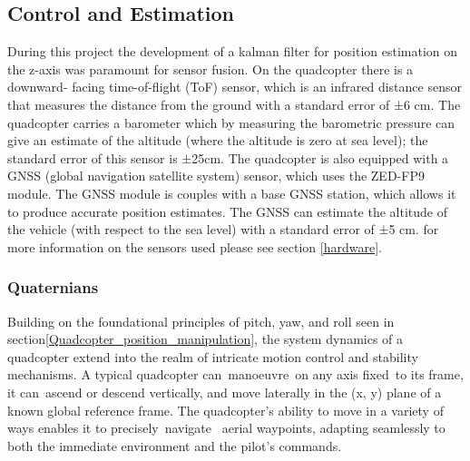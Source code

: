 \documentclass{article}
\begin{document}
\subsection{Control and Estimation}\label{control_and_estimation}
During this project the development of a kalman filter for position estimation on the z-axis was paramount for sensor fusion. On the quadcopter there is a downward- facing time-of-flight (ToF) sensor, which is an infrared distance sensor that measures the distance from the ground with a standard error of ±6 cm. The quadcopter carries a barometer 
which by measuring the barometric pressure can give an estimate of the altitude (where the altitude is zero at sea level); the standard error of this sensor is ±25cm. The quadcopter is also equipped with a GNSS (global navigation satellite system) sensor, which uses the ZED-FP9 module. The GNSS module is couples with a base GNSS station, which 
allows it to produce accurate position estimates. The GNSS can estimate the altitude of the vehicle (with respect to the sea level) with a standard error of ±5 cm. for more information on the sensors used please see section \ref{hardware}.
\subsubsection{Quaternians}
Building on the foundational principles of pitch, yaw, and roll seen in section\ref{Quadcopter_position_manipulation}, the system dynamics of a quadcopter extend into the realm of intricate motion control and stability mechanisms. A typical quadcopter can manoeuvre on any axis fixed to its frame, it can ascend or descend 
vertically, and move laterally in the (x, y) plane of a known global reference frame. The quadcopter's ability to move in a variety of ways enables it to precisely navigate  aerial waypoints, adapting seamlessly to both the immediate environment and the pilot's commands. 
\end{document}
